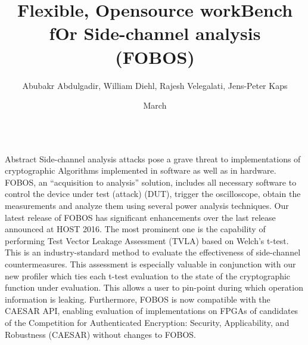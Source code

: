 \documentclass[xcolor=pdftex,dvipsnames,table,final]{beamer}
\title{\LARGE Flexible, Opensource workBench fOr Side-channel analysis\\ \vspace{0.5ex}(FOBOS)}
\author{Abubakr Abdulgadir, William Diehl, Rajesh Velegalati, Jens-Peter Kaps}%
\institute{\vspace{-1ex}Department of Electrical and Computer Engineering, George Mason University, Fairfax, Virginia 22030, USA
          } %
\date{March}
\begin{document}
\begin{frame}[fragile]{} 
  \begin{columns}[t]
    \begin{column}{.31\linewidth}

      \begin{block}{Abstract}
Side-channel analysis attacks pose a grave threat to implementations of cryptographic 
Algorithms implemented in software as well as in hardware. 
FOBOS, an ``acquisition to analysis'' solution, includes all necessary software to control the device 
under test (attack) (DUT), trigger 
the oscilloscope, obtain the measurements and analyze them using several power analysis techniques. 
Our latest release of FOBOS has significant enhancements over
the last release announced at HOST 2016. 
The most prominent one is the capability of 
performing Test Vector Leakage Assessment (TVLA) based on Welch's t-test. This is an industry-standard
method to evaluate the effectiveness of side-channel countermeasures. 
This assessment is especially valuable in conjunction with our new profiler which ties each t-test
evaluation to the state of the cryptographic function under evaluation. This allows a user to 
pin-point during which operation information is leaking. Furthermore, FOBOS is now compatible with 
the CAESAR API, enabling evaluation of implementations on FPGAs of candidates of the 
Competition for Authenticated Encryption: Security, Applicability, and Robustness (CAESAR) without 
changes to FOBOS.
      \end{block}
	 

     


\end{column}
\end{columns}
\end{frame}
\end{document}
